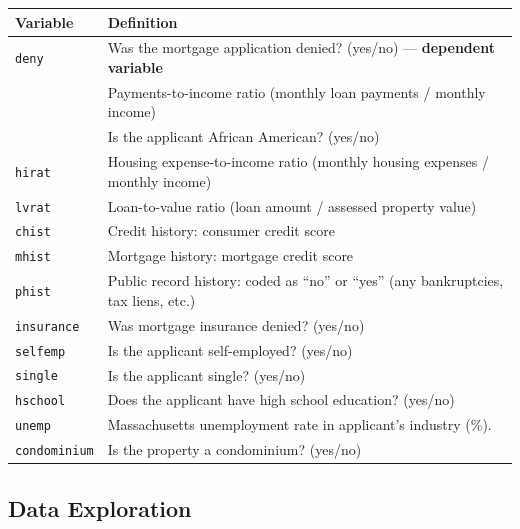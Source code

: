 \documentclass[
  12pt,
  letterpaper,
]{scrbook}
\theoremstyle{plain}
\theoremstyle{definition}
\theoremstyle{remark}
\begin{document}
\begin{longtable}[]{@{}
  >{\raggedright\arraybackslash}p{}
  >{\raggedright\arraybackslash}p{}@{}}
\toprule\noalign{}
\begin{minipage}[b]{\linewidth}\raggedright
Variable
\end{minipage} & \begin{minipage}[b]{\linewidth}\raggedright
Definition
\end{minipage} \\
\midrule\noalign{}
\endhead
\bottomrule\noalign{}
\endlastfoot
{\texttt{deny}} & Was the mortgage application denied? (yes/no) ---
\textbf{dependent variable} \\
{\texttt{pirat}} & Payments-to-income ratio (monthly loan payments /
monthly income) \\
{\texttt{afam}} & Is the applicant African American? (yes/no) \\
\texttt{hirat} & Housing expense-to-income ratio (monthly housing
expenses / monthly income) \\
\texttt{lvrat} & Loan-to-value ratio (loan amount / assessed property
value) \\
\texttt{chist} & Credit history: consumer credit score \\
\texttt{mhist} & Mortgage history: mortgage credit score \\
\texttt{phist} & Public record history: coded as ``no'' or ``yes'' (any
bankruptcies, tax liens, etc.) \\
\texttt{insurance} & Was mortgage insurance denied? (yes/no) \\
\texttt{selfemp} & Is the applicant self-employed? (yes/no) \\
\texttt{single} & Is the applicant single? (yes/no) \\
\texttt{hschool} & Does the applicant have high school education?
(yes/no) \\
\texttt{unemp} & 1989 Massachusetts unemployment rate in applicant's
industry (\%). \\
\texttt{condominium} & Is the property a condominium? (yes/no) \\
\end{longtable}

\subsection{Data Exploration}\label{data-exploration}
\end{document}
